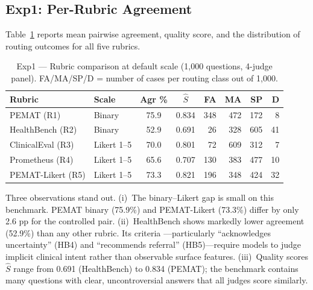 \documentclass[conference]{IEEEtran}
\begin{document}
\subsection{Exp1: Per-Rubric Agreement}

Table~\ref{tab:exp1} reports mean pairwise agreement, quality score,
and the distribution of routing outcomes for all five rubrics.

\begin{table}[t]
\caption{Exp1 --- Rubric comparison at default scale (1,000 questions,
4-judge panel). FA/MA/SP/D = number of cases per routing class out
of 1,000.}
\label{tab:exp1}
\begin{flushleft}
\small
\setlength{\tabcolsep}{10pt}
\renewcommand{\arraystretch}{1.25}
\begin{tabular}{l l c c r r r r}
\toprule
\textbf{Rubric} & \textbf{Scale} & \textbf{Agr \%} & \textbf{$\hat{S}$} & \textbf{FA} & \textbf{MA} & \textbf{SP} & \textbf{D} \\
\midrule
PEMAT (R1)        & Binary      & 75.9 & 0.834 & 348 & 472 & 172 &   8 \\
HealthBench (R2)  & Binary      & 52.9 & 0.691 &  26 & 328 & 605 &  41 \\
ClinicalEval (R3) & Likert 1--5 & 70.0 & 0.801 &  72 & 609 & 312 &   7 \\
Prometheus (R4)   & Likert 1--5 & 65.6 & 0.707 & 130 & 383 & 477 &  10 \\
PEMAT-Likert (R5) & Likert 1--5 & 73.3 & 0.821 & 196 & 348 & 424 &  32 \\
\bottomrule
\end{tabular}
\end{flushleft}
\end{table}

Three observations stand out. (i)~The binary--Likert gap is small on
this benchmark. PEMAT binary (75.9\%) and PEMAT-Likert (73.3\%) differ
by only 2.6 pp for the controlled pair. (ii)~HealthBench shows
markedly lower agreement (52.9\%) than any other rubric. Its criteria
---particularly ``acknowledges uncertainty'' (HB4) and
``recommends referral'' (HB5)---require models to judge implicit
clinical intent rather than observable surface features.
(iii)~Quality scores $\hat{S}$ range from 0.691 (HealthBench) to
0.834 (PEMAT); the benchmark contains many questions with clear,
uncontroversial answers that all judges score similarly.
\end{document}
